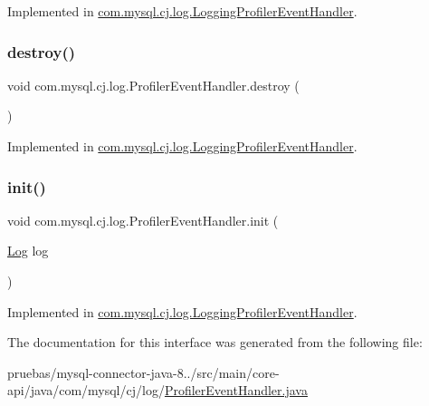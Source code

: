 Implemented in \mbox{\hyperlink{classcom_1_1mysql_1_1cj_1_1log_1_1_logging_profiler_event_handler_a62d6f1a7cdda2e47de6200d255eb5f10}{com.\+mysql.\+cj.\+log.\+Logging\+Profiler\+Event\+Handler}}.

\mbox{\label{interfacecom_1_1mysql_1_1cj_1_1log_1_1_profiler_event_handler_a16c177c9284c3767ba723f61946a8632}} 
\subsubsection{\texorpdfstring{destroy()}{destroy()}}
{\footnotesize\ttfamily void com.\+mysql.\+cj.\+log.\+Profiler\+Event\+Handler.\+destroy (\begin{DoxyParamCaption}{ }\end{DoxyParamCaption})}



Implemented in \mbox{\hyperlink{classcom_1_1mysql_1_1cj_1_1log_1_1_logging_profiler_event_handler_aa1f3a232cf25ed493e6b399ba06a981c}{com.\+mysql.\+cj.\+log.\+Logging\+Profiler\+Event\+Handler}}.

\mbox{\label{interfacecom_1_1mysql_1_1cj_1_1log_1_1_profiler_event_handler_a09601bf613bfb6c51735f6bcbc15ebc7}} 
\subsubsection{\texorpdfstring{init()}{init()}}
{\footnotesize\ttfamily void com.\+mysql.\+cj.\+log.\+Profiler\+Event\+Handler.\+init (\begin{DoxyParamCaption}\item[{\mbox{\hyperlink{interfacecom_1_1mysql_1_1cj_1_1log_1_1_log}{Log}}}]{log }\end{DoxyParamCaption})}



Implemented in \mbox{\hyperlink{classcom_1_1mysql_1_1cj_1_1log_1_1_logging_profiler_event_handler_a3940fb93810bc25e656b2080b7346b84}{com.\+mysql.\+cj.\+log.\+Logging\+Profiler\+Event\+Handler}}.



The documentation for this interface was generated from the following file\+:\begin{DoxyCompactItemize}
\item 
pruebas/mysql-\/connector-\/java-\/8../src/main/core-\/api/java/com/mysql/cj/log/\mbox{\hyperlink{_profiler_event_handler_8java}{Profiler\+Event\+Handler.\+java}}\end{DoxyCompactItemize}
